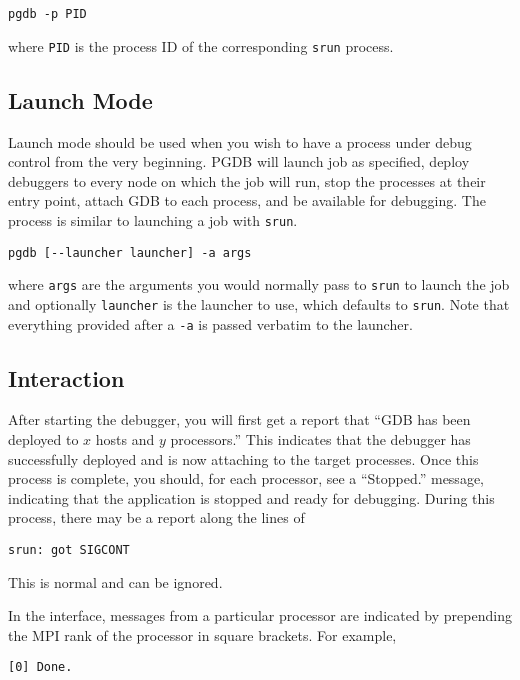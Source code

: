 \documentclass{refart}
\begin{document}
\begin{Verbatim}
pgdb -p PID
\end{Verbatim}

where \texttt{PID} is the process ID of the corresponding \texttt{srun} process.

\subsection{Launch Mode}

Launch mode should be used when you wish to have a process under debug control from the very beginning. PGDB will launch job as specified, deploy debuggers to every node on which the job will run, stop the processes at their entry point, attach GDB to each process, and be available for debugging. The process is similar to launching a job with \texttt{srun}.

\begin{Verbatim}
pgdb [--launcher launcher] -a args
\end{Verbatim}

where \texttt{args} are the arguments you would normally pass to \texttt{srun} to launch the job and optionally \texttt{launcher} is the launcher to use, which defaults to \texttt{srun}. Note that everything provided after a \texttt{-a} is passed verbatim to the launcher.

\subsection{Interaction}

After starting the debugger, you will first get a report that ``GDB has been deployed to $x$ hosts and $y$ processors.'' This indicates that the debugger has successfully deployed and is now attaching to the target processes. Once this process is complete, you should, for each processor, see a ``Stopped.'' message, indicating that the application is stopped and ready for debugging. During this process, there may be a report along the lines of

\begin{Verbatim}
srun: got SIGCONT
\end{Verbatim}

This is normal and can be ignored.

In the interface, messages from a particular processor are indicated by prepending the MPI rank of the processor in square brackets. For example,

\begin{Verbatim}
[0] Done.
\end{Verbatim}
\end{document}
